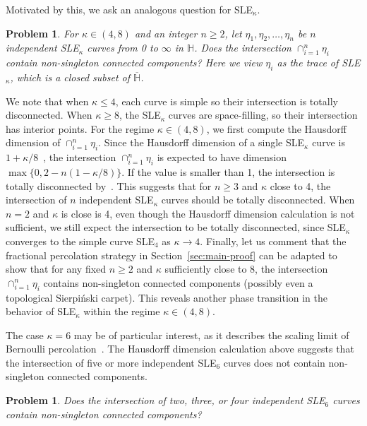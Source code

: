 \documentclass[a4paper]{article}
\numberwithin{equation}{section}
\newtheorem{prob}[theorem]{\bf Problem}
\numberwithin{equation}{section}
\renewcommand{\1}{\mathbf{1}}
\begin{document}
Motivated by this, we ask an analogous question for SLE$_\kappa$. 

\begin{prob}\label{prob:intersection-sle}
    For $\kappa \in (4,8)$ and an integer $n \geq 2$, let $\eta_1,\eta_2,\ldots, \eta_n$ be $n$ independent SLE$_\kappa$ curves from 0 to $\infty$ in $\mathbb{H}$. Does the intersection $\cap_{i=1}^n \eta_i$ contain non-singleton connected components? Here we view $\eta_i$ as the trace of SLE$_\kappa$, which is a closed subset of $\overline{\mathbb{H}}$.
\end{prob}

We note that when $\kappa \leq 4$, each curve is simple so their intersection is totally disconnected. When $\kappa \geq 8$, the SLE$_\kappa$ curves are space-filling, so their intersection has interior points. For the regime $\kappa \in (4,8)$, we first compute the Hausdorff dimension of $\cap_{i=1}^n \eta_i$. Since the Hausdorff dimension of a single SLE$_\kappa$ curve is $1 + \kappa/8$~\cite{Rohde-Schramm-basic, Beffara-dimension}, the intersection $\cap_{i=1}^n \eta_i$ is expected to have dimension $\max \{0, 2 - n(1 - \kappa/8) \}$. If the value is smaller than 1, the intersection is totally disconnected by~\cite[Proposition 3.5]{falconer-fractal-geometry}. This suggests that for $n \geq 3$ and $\kappa$ close to 4, the intersection of $n$ independent SLE$_\kappa$ curves should be totally disconnected. When $n = 2$ and $\kappa$ is close is 4, even though the Hausdorff dimension calculation is not sufficient, we still expect the intersection to be totally disconnected, since SLE$_\kappa$ converges to the simple curve SLE$_4$ as $\kappa \to 4$. Finally, let us comment that the fractional percolation strategy in Section~\ref{sec:main-proof} can be adapted to show that for any fixed $n \geq 2$ and $\kappa$ sufficiently close to 8, the intersection $\cap_{i=1}^n \eta_i$ contains non-singleton connected components (possibly even a topological Sierpi\'nski carpet). This reveals another phase transition in the behavior of SLE$_\kappa$ within the regime $\kappa \in (4,8)$.

The case $\kappa = 6$ may be of particular interest, as it describes the scaling limit of Bernoulli percolation~\cite{Smirnov-per}. The Hausdorff dimension calculation above suggests that the intersection of five or more independent SLE$_6$ curves does not contain non-singleton connected components.

\begin{prob}
    Does the intersection of two, three, or four independent SLE$_6$ curves contain non-singleton connected components?
\end{prob}
\end{document}
